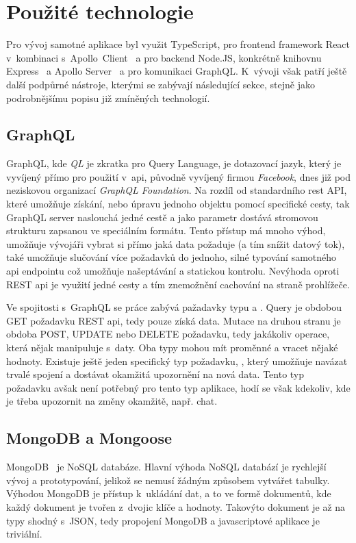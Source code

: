 \section{Použité technologie}
\label{sc:used_techologies}
Pro vývoj samotné aplikace byl využit TypeScript, pro frontend framework React v~kombinaci s~Apollo~Client~\cite{meteordevelopmentgroupinc_2019_apollo} a pro backend Node.JS, konkrétně knihovnu Express~\cite{expresscontributors_2017_express} a Apollo Server~\cite{meteordevelopmentgroupinc_2019_apollo} a pro komunikaci GraphQL. K~vývoji však patří ještě další podpůrné nástroje, kterými se zabývají následující sekce, stejně jako podrobnějšímu popisu již zmíněných technologií.

\subsection{GraphQL}
\label{ss:graphql}
GraphQL, kde \emph{QL} je zkratka pro Query Language, je dotazovací jazyk, který je vyvíjený přímo pro použití v~\acrshort{api}, původně vyvíjený firmou \emph{Facebook}, dnes již pod neziskovou organizací \emph{GraphQL Foundation}. Na rozdíl od standardního \acrshort{rest} API, které umožňuje získání, nebo úpravu jednoho objektu pomocí specifické cesty, tak GraphQL server naslouchá jedné cestě a jako parametr dostává stromovou strukturu zapsanou ve speciálním formátu. Tento přístup má mnoho výhod, umožňuje vývojáři vybrat si přímo jaká data požaduje (a tím snížit datový tok), také umožňuje slučování více požadavků do jednoho, silné typování samotného \acrshort{api} endpointu což umožňuje našeptávání a statickou kontrolu. Nevýhoda oproti REST \acrshort{api} je využití jedné cesty a tím znemožnění cachování na straně prohlížeče. \cite{brito2020rest}

Ve spojitosti s~GraphQL se práce zabývá pažadavky typu  a . Query je obdobou GET požadavku REST \acrshort{api}, tedy pouze získá data. Mutace na druhou stranu je obdoba POST, UPDATE nebo DELETE požadavku, tedy jakákoliv operace, která nějak manipuluje s~daty. Oba typy mohou mít proměnné a vracet nějaké hodnoty. Existuje ještě jeden specifický typ požadavku, , který umožňuje navázat trvalé spojení a dostávat okamžitá upozornění na nová data. Tento typ požadavku avšak není potřebný pro tento typ aplikace, hodí se však kdekoliv, kde je třeba upozornit na změny okamžitě, např. chat. \cite{porcello_2018_learning}

\subsection{MongoDB a Mongoose}
\label{ss:mongoose}
MongoDB~\cite{mongodbinc_2019_the} je NoSQL databáze. Hlavní výhoda NoSQL databází je rychlejší vývoj a prototypování, jelikož se nemusí žádným způsobem vytvářet tabulky. Výhodou MongoDB je přístup k~ukládání dat, a to ve formě dokumentů, kde každý dokument je tvořen z~dvojic klíče a hodnoty. Takovýto dokument je až na typy shodný s~JSON, tedy propojení MongoDB a javascriptové aplikace je triviální.

